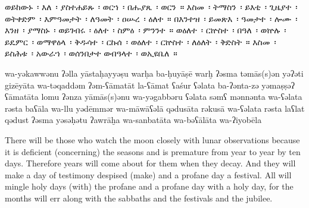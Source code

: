 
\begin{ethiopictext}
    ወይከውኑ~፡ እለ~፡ ያስተሐይጹ~፡ ወርኀ~፡
    በሑያጼ~፡ ወርን~። እስመ~፡ ትማስን~፡ ይእቲ~፡ ጊዜያተ~፡ ወትቀድም~፡
    እምዓመታት~፡ ለዓመት~፡ ዐሡረ~፡ ዕለተ~።
    በእንተዝ~፡ ይመጽእ~፡
    ዓመታተ~፡ ሎሙ~፡ እንዘ~፡ ያማስኑ~፡ ወይገብሩ~፡ ዕለተ~፡ ስምዕ~፡
    ምንንተ~። ወዕለተ~፡ ርኵስተ~፡ በዓለ~፡ ወኵሉ~፡ ይዴምር~፡ ወማዋዕላ~፡ 
    ቅዱሳተ~፡ ርኩሰ~፡ ወዕለተ~፡ ርኵስተ~፡ ለዕለት~፡ ቅድስት~። እስመ~፡
    ይስሕቱ~፡ አውራኀ~፡ ወሰንበታተ ወብዓላተ~፡ ወኢዩቤለ~።
\end{ethiopictext}
\begin{transliteration}
    wa-yəkawwənu ʔəlla yāstaḥayyəṣu warḥa 
    ba-ḥuyāṣē warḫ ʔəsma təmās(s)ən yəʔəti gizēyāta wa-təqaddəm 
    ʔəm-ʕāmatāt la-ʕāmat ʕaśur ʕəlata
    ba-ʔənta-zə yəmaṣṣəʔ 
    ʕāmatāta lomu ʔənza yāmās(s)ənu wa-yəgabbəru ʕəlata səmʕ 
    mənnənta wa-ʕəlata rəsta baʕāla wa-llu yədēmmər wa-māwāʕəlā 
    qədusāta rəkusā wa-ʕəlata rəsta laʕlat qədust ʔəsma
    yəsəḥətu ʔawrāḫa wa-sanbatāta wa-bəʕālāta wa-ʔiyobēla
\end{transliteration}
\begin{translation}
    There will be those who watch the moon closely with lunar observations
    because it is deficient (concerning) the seasons and is premature from year to year by ten days. 
    Therefore
    years will come about for them when they decay. And they will make a day of
    testimony despised (make) and a profane day a festival. All will mingle holy days
    (with) the profane and a profane day with a holy day, for
    the months will err along with the sabbaths and the festivals and the jubilee.
\end{translation}